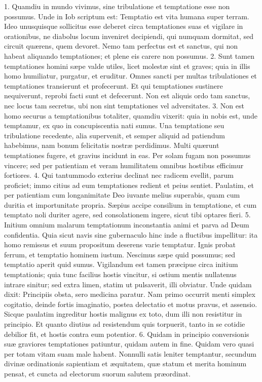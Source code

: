 1. Quamdiu in mundo vivimus, sine tribulatione et temptatione esse non possumus. Unde in Iob scriptum est: Temptatio est vita humana super terram. Ideo unusquisque sollicitus esse deberet circa temptationes suas et vigilare in orationibus, ne diabolus locum inveniret decipiendi, qui numquam dormitat, sed circuit quærens, quem devoret. Nemo tam perfectus est et sanctus, qui non habeat aliquando temptationes; et plene eis carere non possumus.
2. Sunt tamen temptationes homini sæpe valde utiles, licet molestæ sint et graves; quia in illis homo humiliatur, purgatur, et eruditur. Omnes sancti per multas tribulationes et temptationes transierunt et profecerunt. Et qui temptationes sustinere nequiverunt, reprobi facti sunt et defecerunt. Non est aliquis ordo tam sanctus, nec locus tam secretus, ubi non sint temptationes vel adversitates.
3. Non est homo securus a temptationibus totaliter, quamdiu vixerit: quia in nobis est, unde temptamur, ex quo in concupiscentia nati sumus. Una temptatione seu tribulatione recedente, alia supervenit, et semper aliquid ad patiendum habebimus, nam bonum felicitatis nostræ perdidimus. Multi quærunt temptationes fugere, et gravius incidunt in eas. Per solam fugam non possumus vincere; sed per patientiam et veram humilitatem omnibus hostibus efficimur fortiores.
4. Qui tantummodo exterius declinat nec radicem evellit, parum proficiet; immo citius ad eum temptationes redient et peius sentiet. Paulatim, et per patientiam cum longanimitate Deo iuvante melius superabis, quam cum duritia et importunitate propria. Sæpius accipe consilium in temptatione, et cum temptato noli duriter agere, sed consolationem ingere, sicut tibi optares fieri.
5. Initium omnium malarum temptationum inconstantia animi et parva ad Deum confidentia. Quia sicut navis sine gubernaculo hinc inde a fluctibus impellitur: ita homo remissus et suum propositum deserens varie temptatur. Ignis probat ferrum, et temptatio hominem iustum. Nescimus sæpe quid possumus; sed temptatio aperit quid sumus. Vigilandum est tamen præcipue circa initium temptationis; quia tunc facilius hostis vincitur, si ostium mentis nullatenus intrare sinitur; sed extra limen, statim ut pulsaverit, illi obviatur. Unde quidam dixit:
Principiis obsta, sero medicina paratur.
Nam primo occurrit menti simplex cogitatio, deinde fortis imaginatio, postea delectatio et motus pravus, et assensio. Sicque paulatim ingreditur hostis malignus ex toto, dum illi non resistitur in principio. Et quanto diutius ad resistendum quis torpuerit, tanto in se cotidie debilior fit, et hostis contra eum potentior.
6. Quidam in principio conversionis suæ graviores temptationes patiuntur, quidam autem in fine. Quidam vero quasi per totam vitam suam male habent. Nonnulli satis leniter temptantur, secundum divinæ ordinationis sapientiam et æquitatem, quæ statum et merita hominum pensat, et cuncta ad electorum suorum salutem præordinat.
